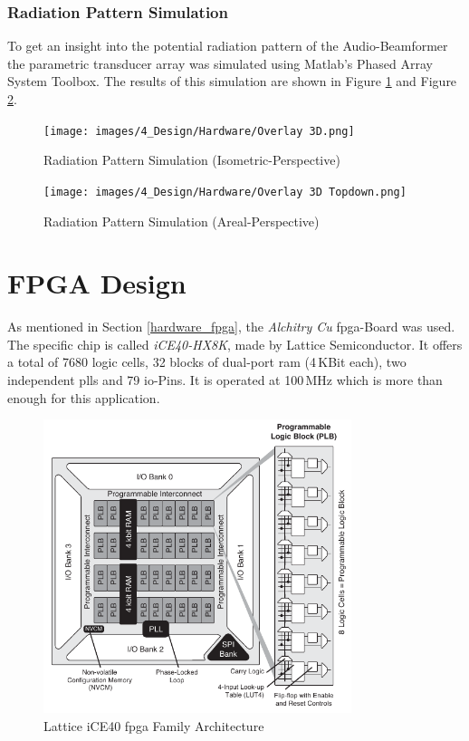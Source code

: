 \subsubsection{Radiation Pattern Simulation}
To get an insight into the potential radiation pattern of the Audio-Beamformer the parametric transducer array was simulated using Matlab's Phased Array System Toolbox. The results of this simulation are shown in Figure \ref{fig:radiation_pattern_isometric}  and Figure \ref{fig:radiation_pattern_areal}.

\begin{figure}[h!]
	\centering
	\texttt{[image: images/4\_Design/Hardware/Overlay 3D.png]}
	\vspace{0.2cm}
    \caption{Radiation Pattern Simulation (Isometric-Perspective)}
    \label{fig:radiation_pattern_isometric}
\end{figure}
\bigskip
\begin{figure}[h!]
	\centering
	\texttt{[image: images/4\_Design/Hardware/Overlay 3D Topdown.png]}
	\vspace{0.2cm}
    \caption{Radiation Pattern Simulation (Areal-Perspective)}
    \label{fig:radiation_pattern_areal}
\end{figure}
\newpage

\section{FPGA Design}
As mentioned in Section \ref{hardware_fpga}, the \textit{Alchitry Cu} \acrshort{fpga}-Board was used. The specific chip is called \textit{iCE40-HX8K}, made by Lattice Semiconductor. It offers a total of 7680 logic cells, 32 blocks of dual-port \acrshort{ram} (4\,KBit each), two independent \acrshort{pll}s and 79 \acrshort{io}-Pins. It is operated at 100\,MHz which is more than enough for this application.

\begin{figure}[h!]
	\centering
	\includegraphics[width=9cm]{images/4_Design/FPGA/iCE40LPHXFamilyDataSheet.pdf}
	\vspace{0.0cm}
    \caption{Lattice iCE40 \acrshort{fpga} Family Architecture \cite{lattice_ice40_fpga_architecture}}
    \label{fig:fpga_family}
\end{figure}

